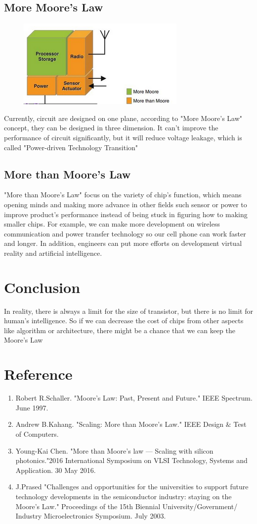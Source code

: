\documentclass[12pt]{article}
\begin{document}
\subsection{More Moore's Law}
\begin{figure}[H]
\centering
\includegraphics[scale=1.5]{P1.png}
\end{figure}
Currently, circuit are designed on one plane, according to "More Moore's Law" concept, they can be designed in three dimension. It can't improve the performance of circuit significantly, but it will reduce voltage leakage, which is called "Power-driven Technology Transition"
\subsection{More than Moore's Law}
"More than Moore's Law" focus on the variety of chip's function, which means opening minds and making more advance in other fields such sensor or power to improve product's performance instead of being stuck in figuring how to making smaller chips. For example, we can make more development on wireless communication and power transfer technology so our cell phone can work faster and longer. In addition, engineers can put more efforts on development virtual reality and artificial intelligence. 
\section{Conclusion}
In reality, there is always a limit for the size of transistor, but there is no limit for human's intelligence. So if we can decrease the cost of chips from other aspects like algorithm or architecture, there might be a chance that we can keep the Moore's Law 
\section{Reference}
\begin{enumerate}[-]
\item Robert R.Schaller. "Moore's Law: Past, Present and Future." IEEE Spectrum. June 1997.
\item Andrew B.Kahang. "Scaling: More than Moore's Law." IEEE Design $\&$ Test of Computers.
\item Young-Kai Chen. "More than Moore's law — Scaling with silicon photonics."2016 International Symposium on VLSI Technology, Systems and Application. 30 May 2016.
\item J.Prased "Challenges and opportunities for the universities to support future technology developments in the semiconductor industry: staying on the Moore's Law."  Proceedings of the 15th Biennial University/Government/ Industry Microelectronics Symposium. July 2003.
\end{enumerate}
\end{document}
